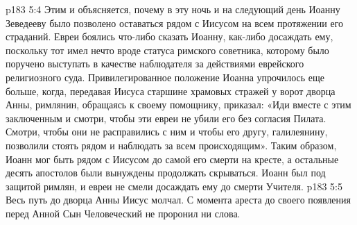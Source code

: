\vs p183 5:4 Этим и объясняется, почему в эту ночь и на следующий день Иоанну Зеведееву было позволено оставаться рядом с Иисусом на всем протяжении его страданий. Евреи боялись что\hyp{}либо сказать Иоанну, как\hyp{}либо досаждать ему, поскольку тот имел нечто вроде статуса римского советника, которому было поручено выступать в качестве наблюдателя за действиями еврейского религиозного суда. Привилегированное положение Иоанна упрочилось еще больше, когда, передавая Иисуса старшине храмовых стражей у ворот дворца Анны, римлянин, обращаясь к своему помощнику, приказал: «Иди вместе с этим заключенным и смотри, чтобы эти евреи не убили его без согласия Пилата. Смотри, чтобы они не расправились с ним и чтобы его другу, галилеянину, позволили стоять рядом и наблюдать за всем происходящим». Таким образом, Иоанн мог быть рядом с Иисусом до самой его смерти на кресте, а остальные десять апостолов были вынуждены продолжать скрываться. Иоанн был под защитой римлян, и евреи не смели досаждать ему до смерти Учителя.
\vs p183 5:5 Весь путь до дворца Анны Иисус молчал. С момента ареста до своего появления перед Анной Сын Человеческий не проронил ни слова.
